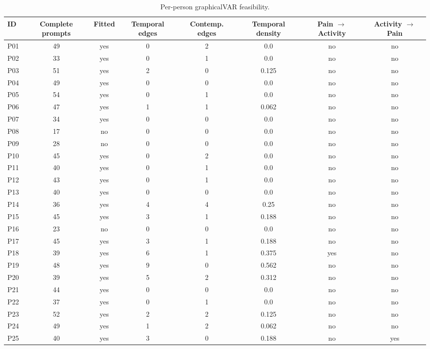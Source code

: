 \begin{table}[H]
\raggedright
\caption{Per-person graphicalVAR feasibility.}
\label{tab:sup-graphicalvar}
\scriptsize
\begingroup
\setlength{\tabcolsep}{4pt}
\renewcommand{\arraystretch}{1.08}
\noindent
\begin{tabular*}{\textwidth}{@{\extracolsep{\fill}}lccccccc@{}}
\toprule
ID & Complete prompts & Fitted & Temporal edges & Contemp. edges & Temporal density & Pain $\rightarrow$ Activity & Activity $\rightarrow$ Pain \\
\midrule
P01 & 49 & yes & 0 & 2 & 0.0 & no & no \\
P02 & 33 & yes & 0 & 1 & 0.0 & no & no \\
P03 & 51 & yes & 2 & 0 & 0.125 & no & no \\
P04 & 49 & yes & 0 & 0 & 0.0 & no & no \\
P05 & 54 & yes & 0 & 1 & 0.0 & no & no \\
P06 & 47 & yes & 1 & 1 & 0.062 & no & no \\
P07 & 34 & yes & 0 & 0 & 0.0 & no & no \\
P08 & 17 & no & 0 & 0 & 0.0 & no & no \\
P09 & 28 & no & 0 & 0 & 0.0 & no & no \\
P10 & 45 & yes & 0 & 2 & 0.0 & no & no \\
P11 & 40 & yes & 0 & 1 & 0.0 & no & no \\
P12 & 43 & yes & 0 & 1 & 0.0 & no & no \\
P13 & 40 & yes & 0 & 0 & 0.0 & no & no \\
P14 & 36 & yes & 4 & 4 & 0.25 & no & no \\
P15 & 45 & yes & 3 & 1 & 0.188 & no & no \\
P16 & 23 & no & 0 & 0 & 0.0 & no & no \\
P17 & 45 & yes & 3 & 1 & 0.188 & no & no \\
P18 & 39 & yes & 6 & 1 & 0.375 & yes & no \\
P19 & 48 & yes & 9 & 0 & 0.562 & no & no \\
P20 & 39 & yes & 5 & 2 & 0.312 & no & no \\
P21 & 44 & yes & 0 & 0 & 0.0 & no & no \\
P22 & 37 & yes & 0 & 1 & 0.0 & no & no \\
P23 & 52 & yes & 2 & 2 & 0.125 & no & no \\
P24 & 49 & yes & 1 & 2 & 0.062 & no & no \\
P25 & 40 & yes & 3 & 0 & 0.188 & no & yes \\

\end{tabular*}
\end{table}
